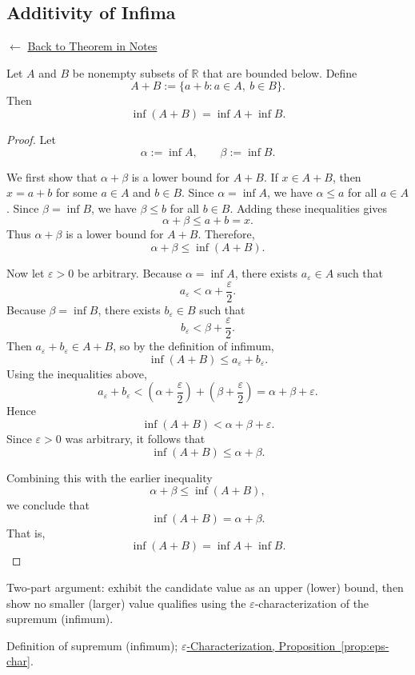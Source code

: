 
\subsection*{Additivity of Infima}
\label{prf:additivity-of-infimums}

\begin{remark*}[Return]
$\leftarrow$ \hyperref[thm:inf-add]{Back to Theorem in Notes}
\end{remark*}

\begin{theorem*}
Let \(A\) and \(B\) be nonempty subsets of \(\mathbb{R}\) that are bounded below. Define
\[
A+B := \{a+b : a\in A,\ b\in B\}.
\]
Then
\[
\inf(A+B)=\inf A+\inf B.
\]
\end{theorem*}

\begin{proof}
Let
\[
\alpha:=\inf A,\qquad \beta:=\inf B.
\]

We first show that \(\alpha+\beta\) is a lower bound for \(A+B\).
If \(x\in A+B\), then \(x=a+b\) for some \(a\in A\) and \(b\in B\).
Since \(\alpha=\inf A\), we have \(\alpha\le a\) for all \(a\in A\).
Since \(\beta=\inf B\), we have \(\beta\le b\) for all \(b\in B\).
Adding these inequalities gives
\[
\alpha+\beta\le a+b=x.
\]
Thus \(\alpha+\beta\) is a lower bound for \(A+B\). Therefore,
\[
\alpha+\beta\le \inf(A+B).
\]

Now let \(\varepsilon>0\) be arbitrary.
Because \(\alpha=\inf A\), there exists \(a_\varepsilon\in A\) such that
\[
a_\varepsilon<\alpha+\frac{\varepsilon}{2}.
\]
Because \(\beta=\inf B\), there exists \(b_\varepsilon\in B\) such that
\[
b_\varepsilon<\beta+\frac{\varepsilon}{2}.
\]
Then \(a_\varepsilon+b_\varepsilon\in A+B\), so by the definition of infimum,
\[
\inf(A+B)\le a_\varepsilon+b_\varepsilon.
\]
Using the inequalities above,
\[
a_\varepsilon+b_\varepsilon
<
\left(\alpha+\frac{\varepsilon}{2}\right)
+
\left(\beta+\frac{\varepsilon}{2}\right)
=
\alpha+\beta+\varepsilon.
\]
Hence
\[
\inf(A+B)<\alpha+\beta+\varepsilon.
\]
Since \(\varepsilon>0\) was arbitrary, it follows that
\[
\inf(A+B)\le \alpha+\beta.
\]

Combining this with the earlier inequality
\[
\alpha+\beta\le \inf(A+B),
\]
we conclude that
\[
\inf(A+B)=\alpha+\beta.
\]
That is,
\[
\inf(A+B)=\inf A+\inf B.
\]
\end{proof}

\begin{remark*}
Two-part argument: exhibit the candidate value as an upper (lower) bound,
then show no smaller (larger) value qualifies using the
$\varepsilon$-characterization of the supremum (infimum).
\end{remark*}

\begin{remark*}[Dependencies]
Definition of supremum (infimum); \hyperref[prop:eps-char]{$\varepsilon$-Characterization, Proposition~\ref*{prop:eps-char}}.
\end{remark*}
